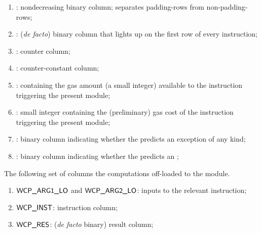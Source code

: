 \begin{enumerate}
	\item \both{\iomf}:
		nondecreasing binary column; separates padding-rows from non-padding-rows;
	\item \first:
		(\emph{de facto}) binary column that lights up on the first row of every instruction;
	\item \ct:
		counter column; 
	\item \maxCt:
		\ccc{} counter-constant column; 
	\item \gasActual: \godGiven{}
		\ccc{} containing the gas amount (a small integer) available to the instruction triggering the present module; 
	\item \gasCost: \godGiven{}
		\ccc{} small integer containing the (preliminary) gas cost of the instruction triggering the present module;
	\item \both{\xAhoy}: \godGiven{}
		\ccbc{} binary column indicating whether the \hubMod{} predicts an exception of any kind;
	\item \both{\oogx}: \godGiven{}
		\ccbc{} binary column indicating whether the \hubMod{} predicts an \oogxSH{};
\end{enumerate}
The following set of columns the computations off-loaded to the \wcpMod{} module.
\begin{enumerate}[resume]
	\item $\textsf{WCP\_ARG1\_LO}$ and $\textsf{WCP\_ARG2\_LO}$:
		inputs to the relevant \wcpMod{} instruction;
	\item $\textsf{WCP\_INST}$:
		instruction column;
	\item $\textsf{WCP\_RES}$:
		(\emph{de facto} binary) result column;
\end{enumerate}
